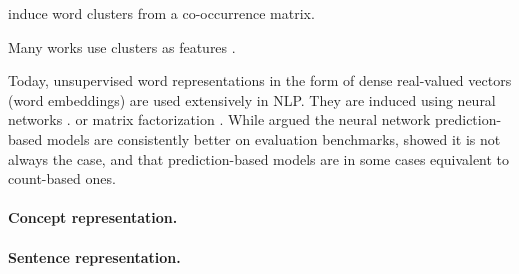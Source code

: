 \documentclass{article}
\begin{document}
\citet{pereira1993distributional} induce word clusters from a co-occurrence matrix.

Many works use clusters as features \cite{miller2004name,koo2008simple,huang2009distributional,zhao2009multilingual}.

Today, unsupervised word representations in the form of dense real-valued vectors
(word embeddings) are used extensively in NLP.
They are induced using neural networks 
\cite{bengio2003neural,mnih2007three,collobert2008unified,turian2010word,mikolov2013efficient}.
or matrix factorization \cite{pennington2014glove}.
While \citet{baroni2014don} argued the neural network prediction-based models are
consistently better on evaluation benchmarks, \citet{levy2015improving} showed
it is not always the case, and that prediction-based models are in some cases
equivalent to count-based ones.

\paragraph{Concept representation.}


\paragraph{Sentence representation.}




\end{document}
